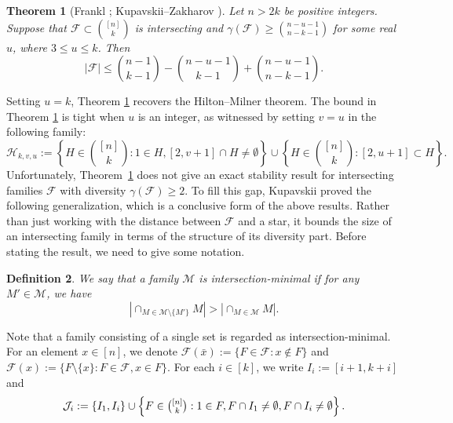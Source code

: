 \documentclass[11pt]{article}
\newcommand{\m}{\mathcal}
\newtheorem{theorem}{Theorem}[section]
\newtheorem{definition}[theorem]{Definition}
\begin{document}
\begin{theorem}[Frankl \cite{Frankl-max-degree};  Kupavskii--Zakharov \cite{KZ2018}] \label{thm:FKZ}
Let $n>2k$ be positive integers. Suppose that \( \mathcal{F} \subset \binom{[n]}{k} \) is intersecting and $\gamma(\m F)\ge {n-u-1\choose  n-k-1}$ for some real $u$, where $3\le u\le k$. Then
\[
|\mathcal{F}| \leq \binom{n-1}{k-1} - \binom{n-u-1}{k-1} + \binom{n-u-1}{n-k-1}.
\]
\end{theorem}


Setting $u=k$, Theorem \ref{thm:FKZ} recovers the Hilton--Milner theorem. The bound in Theorem \ref{thm:FKZ} is tight when $u$ is an integer, as witnessed by setting $v=u$ in the following family: 
\begin{equation}\label{example}
\mathcal{H}_{k,v,u}:= \left\{H\in {[n]\choose k}: 1\in H, [2,v+1]\cap H\ne \emptyset \right\} \cup \left\{H\in {[n]\choose k}: [2,u+1]\subset H \right\}.\end{equation}
Unfortunately, Theorem~\ref{thm:FKZ} does not give an exact stability result for intersecting families $\m F$ with diversity $\gamma(\m F) \ge 2$. 
To fill this gap, Kupavskii \cite{Kup2018, 11-23-2} proved the following generalization, which is a conclusive form of the above results. Rather than just working with the distance between $\mathcal{F}$ and a star, it bounds the size of an intersecting family in terms of the structure of its diversity part. Before stating the result, we need to give some notation.

\begin{definition}
    We say that a family $\mathcal{M}$ is { \it intersection-minimal} if for any $M'\in \mathcal{M}$, we have 
    \[ \left|\cap_{M\in \mathcal{M}\setminus \{M'\}} M \right| 
    > \left|\cap_{M\in \mathcal{M}}M \right|. \]
\end{definition}
Note that a family consisting of a single set is regarded as intersection-minimal.
For an element $x\in [n]$, we denote  
$\mathcal{F}(\bar{x}):=\{F\in \mathcal{F} : x\notin F\}$ and 
$\mathcal{F}(x) :=\{F\setminus \{x\} : F\in \mathcal{F}, x\in F \}$. 
For each $i\in [k]$, we write $I_i:=[i+1,k+i]$ and
\[
\mathcal{J}_{i}:=\{I_1, I_i\}\cup \left\{F\in \tbinom{[n]}{ k}: 1\in F, F\cap I_1\ne \emptyset, F\cap I_i\ne \emptyset \right\}.
\]
\end{document}
